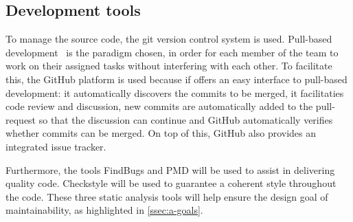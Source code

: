 \subsection{Development tools}
\label{ssec:a-tools}

To manage the source code, the git version control system is used. Pull-based
development~\cite{Gousios14} is the paradigm chosen, in order for each member of
the team to work on their assigned tasks without interfering with each other.
To facilitate this, the GitHub platform is used because if offers an easy
interface to pull-based development: it automatically discovers the commits to
be merged, it facilitaties code review and discussion, new commits are
automatically added to the pull-request so that the discussion can continue and
GitHub automatically verifies whether commits can be merged. On top of this,
GitHub also provides an integrated issue tracker.

Furthermore, the tools FindBugs and PMD will be used to assist in delivering
quality code. Checkstyle will be used to guarantee a coherent style throughout
the code. These three static analysis tools will help ensure the design goal of
maintainability, as highlighted in \cref{ssec:a-goals}.

